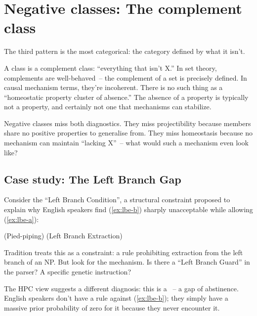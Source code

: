 \section{Negative classes: The complement class}
\label{sec:8:negative}

The third pattern is the most categorical: the category defined by what it isn't.

A  class is a complement class: \enquote{everything that isn't X.} In set theory, complements are well-behaved~-- the complement of a set is precisely defined. In causal mechanism terms, they're incoherent. There is no such thing as a \enquote{homeostatic property cluster of absence.} The absence of a property is typically not a property, and certainly not one that mechanisms can stabilize.

Negative classes miss both diagnostics. They miss projectibility because members share no positive properties to generalise from. They miss homeostasis because no mechanism can maintain \enquote{lacking X}~-- what would such a mechanism even look like?


\subsection{Case study: The Left Branch Gap}
\label{sec:8:left-branch}

Consider the \enquote{Left Branch Condition}, a structural constraint proposed to explain why English speakers find (\ref{ex:lbe-b}) sharply unacceptable while allowing (\ref{ex:lbe-a}):

\ea
\label{ex:lbe}
\ea {} (Pied-piping)\label{ex:lbe-a} \ex
\label{ex:lbe-b}
\ungram{} (Left Branch Extraction)
\z
\z

Tradition treats this as a constraint: a rule prohibiting extraction from the left branch of an NP. But look for the mechanism. Is there a \enquote{Left Branch Guard} in the parser? A specific genetic instruction?

The HPC view suggests a different diagnosis: this is a ~-- a gap of abstinence. English speakers don't have a rule against (\ref{ex:lbe-b}); they simply have a massive prior probability of zero for it because they never encounter it.

